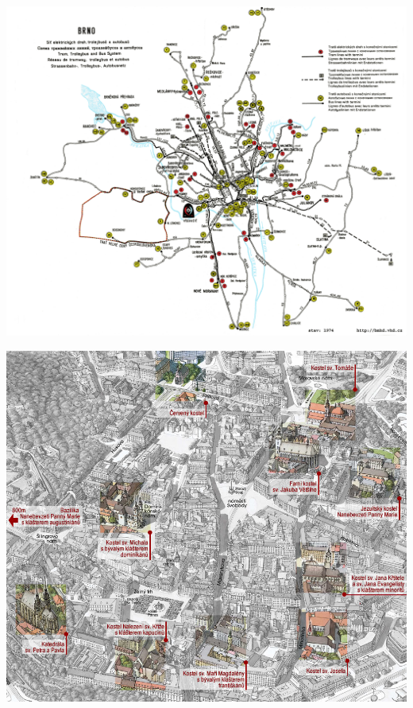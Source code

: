 \documentclass[14pt]{beamer}
\begin{document}
\begin{frame}
	\begin{center}
		\href{http://static.bmhd.cz/data/bmhd-archiv/mapy_linek/1974geod.png}{\includegraphics[scale=1.25]{1974geod.png}}
	\end{center}	
\end{frame}

\begin{frame}
	\begin{center}
		\href{http://brno.biskupstvi.cz/petrov/images/mapy/mapa_brno_stred.jpg}{\includegraphics[scale=0.3]{mapa_brno_stred.jpg}}
	\end{center}	
\end{frame}
\end{document}
